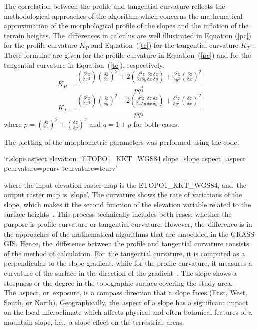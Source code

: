 \documentclass[technologies,article,accept,pdftex,moreauthors]{Definitions/mdpi}
\begin{document}
The correlation between the profile and tangential curvature reflects the methodological approaches of the algorithm which concerns the mathematical approximation of the morphological profile of the slopes and the inflation of the terrain heights. The~differences in calculus are well illustrated in Equation (\ref{pc}) for the profile curvature $K_P$ \cite{Golden} and \mbox{Equation (\ref{tc})} for the tangential curvature $K_T$ \cite{Golden}. These formulae are given for the profile curvature in Equation~(\ref{pc}) and for the tangential curvature in Equation~(\ref{tc}), respectively.
\begin{equation}
  \label{pc}
 K_P=\frac{\left(\frac{\delta^2 z}{\delta x^2}\right) \left(\frac{\delta z}{\delta x}\right)^2 + 2\left(\frac{\delta^2 z}{\delta x \delta y}\frac{\delta z}{\delta x}\frac{\delta z}{\delta y} \right) + \frac{\delta^2 z}{\delta y^2} \left(\frac{\delta z}{\delta x}\right)^2}{pq^\frac{3}{2}}
\end{equation}
\begin{equation}
  \label{tc}
 K_T=\frac{\left(\frac{\delta^2 z}{\delta x^2}\right) \left(\frac{\delta z}{\delta y}\right)^2 - 2\left(\frac{\delta^2 z}{\delta x \delta y}\frac{\delta z}{\delta x}\frac{\delta z}{\delta y} \right) + \frac{\delta^2 z}{\delta y^2} \left(\frac{\delta z}{\delta x}\right)^2}{pq^\frac{1}{2}}
\end{equation}
where $p=\left(\frac{\delta z}{\delta x}\right)^2+\left(\frac{\delta z}{\delta y}\right)^2$ and $q=1+p$ for both~cases.

The plotting {of the morphometric parameters }was performed using the code: 

\begin{spverbatim}
‘r.slope.aspect elevation=ETOPO1_KKT_WGS84 slope=slope aspect=aspect 
pcurvature=pcurv tcurvature=tcurv’
\end{spverbatim}
\vspace{6pt}
\noindent where the input elevation raster map is the ETOPO1\_KKT\_WGS84, and~the output raster map is ‘slope’. {The curvature} shows the rate of variations of the slope, which makes it the second function of the elevation variable related to the surface heights~\cite{Schmidt}. This process{ }technically {includes} both cases: whether the purpose is profile curvature or tangential curvature. However, the~difference is in the approaches of the mathematical algorithms that are embedded in the GRASS GIS. Hence, the~difference between the profile and tangential curvature consists of the method of calculation. For~the tangential curvature, it is computed as a perpendicular to the slope gradient, while for the profile curvature, it measures a curvature of the surface in the direction of the gradient~\cite{Gallant}. {The slope} shows a steepness or the degree in the topographic surface covering the study area. The~aspect, or~exposure, is a compass direction that a slope faces (East, West, South, or North). Geographically, the~aspect of a slope has a significant impact on the local microclimate which affects physical and often botanical features of a mountain slope, i.e.,~a slope effect on the terrestrial~areas. 
\end{document}
